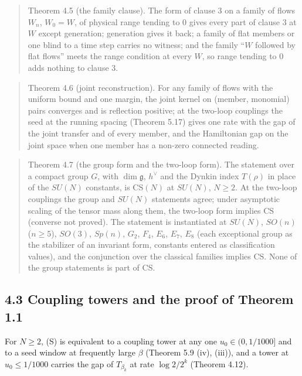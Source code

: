 \documentclass[10pt,letterpaper,twocolumn]{article}
\begin{document}
\begin{quote}
Theorem 4.5 (the family clause). The form of clause 3 on a family of flows \(W_n\), \(W_0=W\), of physical range tending to \(0\) gives every part of clause 3 at \(W\) except generation; generation gives it back; a family of flat members or one blind to a time step carries no witness; and the family ``\(W\) followed by flat flows'' meets the range condition at every \(W\), so range tending to \(0\) adds nothing to clause 3.
\end{quote}

\begin{quote}
Theorem 4.6 (joint reconstruction). For any family of flows with the uniform bound and one margin, the joint kernel on (member, monomial) pairs converges and is reflection positive; at the two-loop couplings the seed at the running spacing (Theorem 5.17) gives one rate with the gap of the joint transfer and of every member, and the Hamiltonian gap on the joint space when one member has a non-zero connected reading.
\end{quote}

\begin{quote}
Theorem 4.7 (the group form and the two-loop form). The statement over a compact group \(G\), with \(\dim\mathfrak g\), \(h^\vee\) and the Dynkin index \(T(\rho)\) in place of the \(SU(N)\) constants, is \(\mathrm{CS}(N)\) at \(SU(N)\), \(N\ge2\). At the two-loop couplings the group and \(SU(N)\) statements agree; under asymptotic scaling of the tensor mass along them, the two-loop form implies \(\mathrm{CS}\) (converse not proved). The statement is instantiated at \(SU(N)\), \(SO(n)\) (\(n\ge5\)), \(SO(3)\), \(Sp(n)\), \(G_2\), \(F_4\), \(E_6\), \(E_7\), \(E_8\) (each exceptional group as the stabilizer of an invariant form, constants entered as classification values), and the conjunction over the classical families implies \(\mathrm{CS}\). None of the group statements is part of \(\mathrm{CS}\).
\end{quote}

\subsection{4.3 Coupling towers and the proof of Theorem 1.1}\label{43-coupling-towers-and-the-proof-of-theorem-11}

For \(N\ge2\), (S) is equivalent to a coupling tower at any one \(u_0\in(0,1/1000]\) and to a seed window at frequently large \(\beta\) (Theorem 5.9 (iv), (iii)), and a tower at \(u_0\le1/1000\) carries the gap of \(T_{\beta_k}\) at rate \(\log2/2^k\) (Theorem 4.12).
\end{document}

